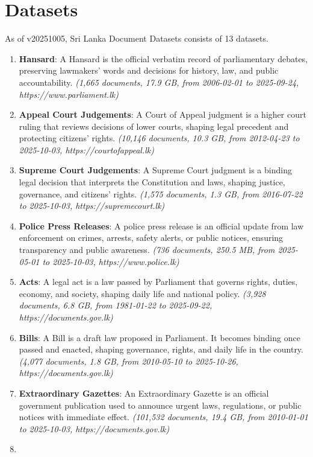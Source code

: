 \documentclass[10pt,a4paper,twocolumn]{article}%
\begin{document}
\section{Datasets}%
\label{sec:Datasets}%
As of v20251005, Sri Lanka Document Datasets consists of 13 datasets.%
\begin{enumerate}%
\item%
\textbf{Hansard}: A Hansard is the official verbatim record of parliamentary debates, preserving lawmakers’ words and decisions for history, law, and public accountability.\textit{ (1,665 documents, 17.9 GB, from 2006{-}02{-}01 to 2025{-}09{-}24, https://www.parliament.lk)}%
\item%
\textbf{Appeal Court Judgements}: A Court of Appeal judgment is a higher court ruling that reviews decisions of lower courts, shaping legal precedent and protecting citizens’ rights.\textit{ (10,146 documents, 10.3 GB, from 2012{-}04{-}23 to 2025{-}10{-}03, https://courtofappeal.lk)}%
\item%
\textbf{Supreme Court Judgements}: A Supreme Court judgment is a binding legal decision that interprets the Constitution and laws, shaping justice, governance, and citizens’ rights.\textit{ (1,575 documents, 1.3 GB, from 2016{-}07{-}22 to 2025{-}10{-}03, https://supremecourt.lk)}%
\item%
\textbf{Police Press Releases}: A police press release is an official update from law enforcement on crimes, arrests, safety alerts, or public notices, ensuring transparency and public awareness.\textit{ (736 documents, 250.5 MB, from 2025{-}05{-}01 to 2025{-}10{-}03, https://www.police.lk)}%
\item%
\textbf{Acts}: A legal act is a law passed by Parliament that governs rights, duties, economy, and society, shaping daily life and national policy.\textit{ (3,928 documents, 6.8 GB, from 1981{-}01{-}22 to 2025{-}09{-}22, https://documents.gov.lk)}%
\item%
\textbf{Bills}: A Bill is a draft law proposed in Parliament. It becomes binding once passed and enacted, shaping governance, rights, and daily life in the country.\textit{ (4,077 documents, 1.8 GB, from 2010{-}05{-}10 to 2025{-}10{-}26, https://documents.gov.lk)}%
\item%
\textbf{Extraordinary Gazettes}: An Extraordinary Gazette is an official government publication used to announce urgent laws, regulations, or public notices with immediate effect.\textit{ (101,532 documents, 19.4 GB, from 2010{-}01{-}01 to 2025{-}10{-}03, https://documents.gov.lk)}%
\item%

\end{enumerate}
\end{document}
